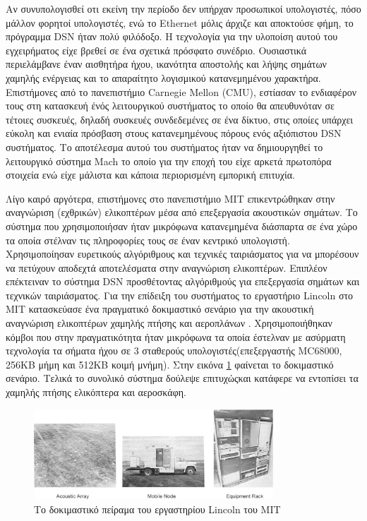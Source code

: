 Αν συνυπολογισθεί οτι εκείνη την περίοδο δεν υπήρχαν προσωπικοί υπολογιστές, πόσο μάλλον φορητοί υπολογιστές, ενώ το Ethernet μόλις άρχιζε και αποκτούσε φήμη, το
πρόγραμμα DSN ήταν πολύ φιλόδοξο.
Η τεχνολογία για την υλοποίση αυτού του εγχειρήματος είχε βρεθεί σε ένα σχετικά πρόσφατο συνέδριο\cite{1978DSN}.
Ουσιαστικά περιελάμβανε έναν αισθητήρα ήχου, ικανότητα αποστολής και λήψης σημάτων χαμηλής ενέργειας και το απαραίτητο λογισμικού κατανεμημένου χαρακτήρα.
Επιστήμονες από το πανεπιστήμιο Carnegie Mellon (CMU), εστίασαν το ενδιαφέρον τους στη κατασκευή ένός λειτουργικού συστήματος το οποίο θα απευθυνόταν σε τέτοιες
συσκευές, δηλαδή συσκευές συνδεδεμένες σε ένα δίκτυο, στις οποίες υπάρχει εύκολη και ενιαία πρόσβαση στους κατανεμημένους πόρους ενός αξιόπιστου DSN συστήματος.
Το αποτέλεσμα αυτού του συστήματος ήταν να δημιουργηθεί το λειτουργικό σύστημα Mach το οποίο για την εποχή του είχε αρκετά πρωτοπόρα στοιχεία \cite{Mach} ενώ είχε
μάλιστα και κάποια περιορισμένη εμπορική επιτυχία.

Λίγο καιρό αργότερα, επιστήμονες στο πανεπιστήμιο MIT επικεντρώθηκαν στην αναγνώριση (εχθρικών) ελικοπτέρων μέσα από επεξεργασία ακουστικών σημάτων.
Το σύστημα που χρησιμοποιήσαν ήταν μικρόφωνα κατανεμημένα διάσπαρτα σε ένα χώρο τα οποία στέλναν τις πληροφορίες τους σε έναν κεντρικό υπολογιστή.
Χρησιμοποίησαν ευρετικούς αλγόριθμους και τεχνικές ταιριάσματος για να μπορέσουν να πετύχουν αποδεχτά αποτελέσματα στην αναγνώριση ελικοπτέρων.
Επιπλέον επέκτειναν το σύστημα DSN προσθέτοντας αλγόριθμούς για επεξεργασία σημάτων και τεχνικών ταιριάσματος\cite{4789229}.
Για την επίδειξη του συστήματος το εργαστήριο Lincoln στο MIT κατασκεύασε ένα πραγματικό δοκιμαστικό σενάριο για την ακουστική αναγνώριση ελικοπτέρων χαμηλής πτήσης
και αεροπλάνων \cite{aircraft}.
Χρησιμοποιήθηκαν κόμβοι που στην πραγματικότητα ήταν μικρόφωνα τα οποία έστελναν με ασύρματη τεχνολογία τα σήματα ήχου σε 3 σταθερούς υπολογιστές(επεξεργαστής
MC68000, 256KB μήμη και 512ΚΒ κοιμή μνήμη).
Στην εικόνα \ref{fig:lincoln_lab}\cite{lincoln_report} φαίνεται το δοκιμαστικό σενάριο.
Τελικά το συνολικό σύστημα δούλεψε επιτυχώςκαι κατάφερε να εντοπίσει τα χαμηλής πτήσης ελικόπτερα και αεροσκάφη.
\begin{figure}[h]
	\centering
	\includegraphics[width=0.8\textwidth]{images/lincoln_lab.eps}
	\caption{Tο δοκιμαστικό πείραμα του εργαστηρίου Lincoln του MIT}
	\label{fig:lincoln_lab}
\end{figure}

